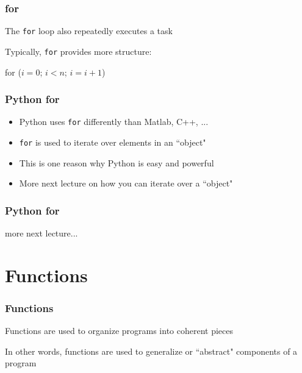 \documentclass{beamer}
\begin{document}
\begin{frame}
\frametitle{for}
The \texttt{for} loop also repeatedly executes a task

\vspace{0.1in}

Typically, \texttt{for} provides more structure:

\vspace{0.1in}

\centering
for ($i = 0$; $i < n$; $i = i + 1$)

\end{frame}



\begin{frame}
\frametitle{Python for}
\begin{itemize}
\setlength{\itemsep}{0.2in}
\item{Python uses \texttt{for} differently than Matlab, C++, ...}
\item{\texttt{for} is used to iterate over elements in an ``object"}
\item{This is one reason why Python is easy and powerful}
\item{More next lecture on how you can iterate over a ``object"}
\end{itemize}

\end{frame}

\begin{frame}
\frametitle{Python for}


\vspace{0.5in}

more next lecture...

\end{frame}


\section{Functions}
\begin{frame}
\frametitle{Functions}
Functions are used to organize programs into coherent pieces

\vspace{0.2in}

In other words, functions are used to generalize or ``abstract" components of a program 
\end{frame}
\end{document}
